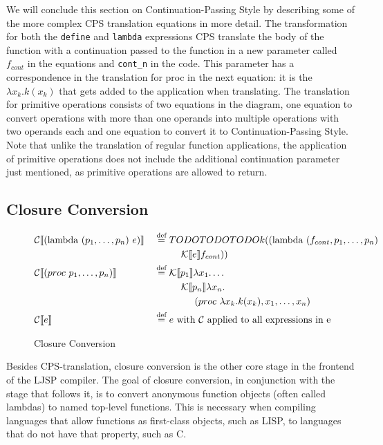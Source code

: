 \documentclass[11pt]{report}
\newcommand{\eqdef}{\stackrel{\text{def}}{=}}%
\newcommand{\cpstrans}[1]{\ensuremath{\mathcal{K}\llbracket #1 \rrbracket}}
\begin{document}
We will conclude this section on Continuation-Passing Style by describing some of the more complex CPS translation equations in more detail. The transformation for both the \texttt{define} and \texttt{lambda} expressions CPS translate the body of the function with a continuation passed to the function in a new parameter called $f_{cont}$ in the equations and \texttt{cont_n} in the code. This parameter has a correspondence in the translation for proc in the next equation: it is the $\lambda x_k.k(x_k)$ that gets added to the application when translating. The translation for primitive operations consists of two equations in the diagram, one equation to convert operations with more than one operands into multiple operations with two operands each and one equation to convert it to Continuation-Passing Style. Note that unlike the translation of regular function applications, the application of primitive operations does not include the additional continuation parameter just mentioned, as primitive operations are allowed to return.

\subsection{Closure Conversion}
\begin{figure}[ht]
\begin{alignat*}{2}
&\mathcal{C}\llbracket (\text{lambda}\ (p_1, \dots, p_n)\ e) \rrbracket &&\eqdef TODO TODO TODOk((\text{lambda}\ (f_{cont}, p_1, \dots, p_n)\ \\
&&&\hspace{1cm}\cpstrans{e}f_{cont})) \\
%
&\mathcal{C}\llbracket (proc\ p_1, \dots, p_n) \rrbracket &&\eqdef \cpstrans{p_1} \lambda x_1. \dots  \\
&&&\hspace{1 cm}\cpstrans{p_n} \lambda x_n.\\
&&&\hspace{1.5 cm}(proc\ \lambda x_k.k(x_k), x_1, \dots, x_n) \\
&\mathcal{C}\llbracket e \rrbracket && \eqdef e\text{ with $\mathcal{C}$ applied to all expressions in e}\\
\end{alignat*}
\caption{Closure Conversion}
\label{cloconv}
\end{figure}
Besides CPS-translation, closure conversion is the other core stage in the frontend of the LJSP compiler. The goal of closure conversion, in conjunction with the stage that follows it, is to convert anonymous function objects (often called lambdas) to named top-level functions. This is necessary when compiling languages that allow functions as first-class objects, such as LISP, to languages that do not have that property, such as C.
\end{document}
